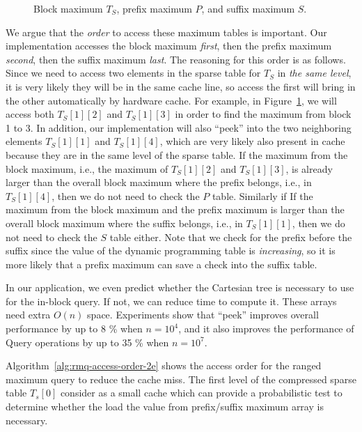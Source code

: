 

\begin{figure}[!thb]
  \centering {}  \caption{Block maximum $T_S$, prefix maximum $P$, and suffix
    maximum $S$.}
  \label{fig:compressed-sp-opt}
\end{figure}

We argue that the {\em order} to access these maximum tables is
important.  Our implementation accesses the block maximum {\em first},
then the prefix maximum {\em second}, then the suffix maximum {\em
  last}.  The reasoning for this order is as follows.  Since we need
to access two elements in the sparse table for $T_S$ in {\em the same
  level}, it is very likely they will be in the same cache line, so
access the first will bring in the other automatically by hardware
cache.  For example, in Figure~\ref{fig:compressed-sp-opt}, we will
access both $T_{S}[1][2]$ and $T_{S}[1][3]$ in order to find the
maximum from block 1 to 3.  In addition, our implementation will also
``peek'' into the two neighboring elements $T_{S}[1][1]$ and
$T_{S}[1][4]$, which are very likely also present in cache because
they are in the same level of the sparse table.  If the maximum from
the block maximum, i.e., the maximum of $T_{S}[1][2]$ and
$T_{S}[1][3]$, is already larger than the overall block maximum where
the prefix belongs, i.e., in $T_{S}[1][4]$, then we do not need to
check the $P$ table.  Similarly if If the maximum from the block
maximum and the prefix maximum is larger than the overall block maximum
where the suffix belongs, i.e., in $T_{S}[1][1]$, then we do not need
to check the $S$ table either.  Note that we check for the prefix
before the suffix since the value of the dynamic programming table is
{\em increasing}, so it is more likely that a prefix maximum can save a
check into the suffix table.




  
In our application, we even predict whether the Cartesian tree is
necessary to use for the in-block query. If not, we can reduce time to
compute it. These arrays need extra $O(n)$ space.  Experiments show that
``peek'' improves overall performance by up to 8 \% when $n = 10^4$, and
it also improves the performance of {\sc Query} operations by up to 35
\% when $n = 10^7$.

Algorithm~\ref{alg:rmq-access-order-2e} shows the access order for the
ranged maximum query to reduce the cache miss.  The first level of the
compressed sparse table $T_s[0]$ consider as a small cache which can
provide a probabilistic test to determine whether the load the value
from prefix/suffix maximum array is necessary.



